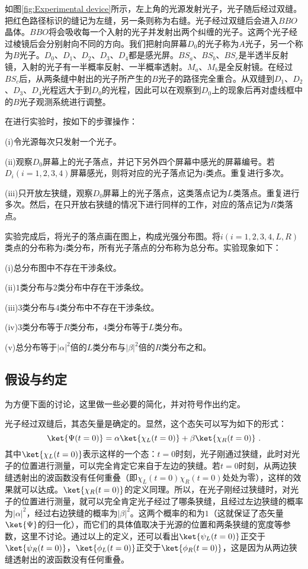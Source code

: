 

如图\ref{fig:Experimental device}所示，左上角的光源发射光子，光子随后经过双缝。把红色路径标识的缝记为左缝，另一条则称为右缝。光子经过双缝后会进入$BBO$晶体。$BBO$将会吸收每一个入射的光子并发射出两个纠缠的光子。这两个光子经过棱镜后会分别射向不同的方向。我们把射向屏幕$D_0$的光子称为$A$光子，另一个称为$B$光子。$D_0$、$D_1$、$D_2$、$D_3$、$D_4$都是感光屏。$BS_a$、$BS_b$、$BS_c$是半透半反射镜，入射的光子有一半概率反射、一半概率透射。$M_a$、$M_b$是全反射镜。在经过$BS_c$后，从两条缝中射出的光子所产生的$B$光子的路径完全重合。从双缝到$D_1$、$D_2$、$D_3$、$D_4$光程远大于到$D_0$的光程，因此可以在观察到$D_0$上的现象后再对虚线框中的$B$光子观测系统进行调整。

在进行实验时，按如下的步骤操作：

(i)令光源每次只发射一个光子。

(ii)观察$D_0$屏幕上的光子落点，并记下另外四个屏幕中感光的屏幕编号。若$D_i(i=1,2,3,4)$屏幕感光，则将对应的光子落点记为$i$类点。重复进行多次。

(iii)只开放左狭缝，观察$D_0$屏幕上的光子落点，这类落点记为$L$类落点。重复进行多次。然后，在只开放右狭缝的情况下进行同样的工作，对应的落点记为$R$类落点。

实验完成后，将光子的落点画在图上，构成光强分布图。将$i(i=1,2,3,4,L,R)$类点的分布称为$i$类分布，所有光子落点的分布称为总分布。实验现象如下：

(i)总分布图中不存在干涉条纹。

(ii)$1$类分布与$2$类分布中存在干涉条纹。

(iii)$3$类分布与$4$类分布中不存在干涉条纹。

(iv)$3$类分布等于$R$类分布，$4$类分布等于$L$类分布。

(v)总分布等于$|\alpha|^2$倍的$L$类分布与$|\beta|^2$倍的$R$类分布之和。

\subsection{假设与约定}
为方便下面的讨论，这里做一些必要的简化，并对符号作出约定。

光子经过双缝后，其态矢量是确定的。显然，这个态矢可以写为如下的形式：
\begin{equation}
\ket{\Psi(t=0)} =\alpha\ket{\chi_L(t=0)}+\beta\ket{\chi_R(t=0)}~.
\end{equation}
其中$\ket{\chi_L(t=0)}$表示这样的一个态：$t=0$时刻，光子刚通过狭缝，此时对光子的位置进行测量，可以完全肯定它来自于左边的狭缝。若$t=0$时刻，从两边狭缝透射出的波函数没有任何重叠（即$\chi_L(t=0)\chi_R(t=0)$处处为零），这样的效果就可以达成。$\ket{\chi_R(t=0)}$的定义同理。所以，在光子刚经过狭缝时，对光子的位置进行测量，就可以完全肯定光子经过了哪条狭缝，且经过左边狭缝的概率为$|\alpha|^2$，经过右边狭缝的概率为$|\beta|^2$。这两个概率的和为$1$（这就保证了态矢量$\ket{\Psi}$的归一化），而它们的具体值取决于光源的位置和两条狭缝的宽度等参数，这里不讨论。通过以上的定义，还可以看出$\ket{\psi_L(t=0)}$正交于$\ket{\psi_R(t=0)}$，$\ket{\phi_L(t=0)}$正交于$\ket{\phi_R(t=0)}$，这是因为从两边狭缝透射出的波函数没有任何重叠。

